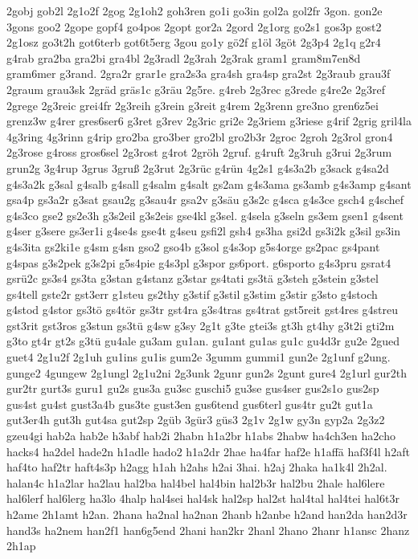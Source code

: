 {2gobj
gob2l
2g1o2f
2gog
2g1oh2
goh3ren
go1i
go3in
gol2a
gol2fr
3gon.
gon2e
3gons
goo2
2gope
gopf4
go4pos
2gopt
gor2a
2gord
2g1org
go2s1
gos3p
gost2
2g1osz
go3t2h
got6terb
got6t5erg
3gou
go1y
gö2f
g1öl
3göt
2g3p4
2g1q
g2r4
g4rab
gra2ba
gra2bi
gra4bl
2g3radl
2g3rah
2g3rak
gram1
gram8m7en8d
gram6mer
g3rand.
2gra2r
grar1e
gra2s3a
gra4sh
gra4sp
gra2st
2g3raub
grau3f
2graum
grau3sk
2gräd
gräs1c
g3räu
2g5re.
g4reb
2g3rec
g3rede
g4re2e
2g3ref
2grege
2g3reic
grei4fr
2g3reih
g3rein
g3reit
g4rem
2g3renn
gre3no
gren6z5ei
grenz3w
g4rer
gres6ser6
g3ret
g3rev
2g3ric
gri2e
2g3riem
g3riese
g4rif
2grig
gril4la
4g3ring
4g3rinn
g4rip
gro2ba
gro3ber
gro2bl
gro2b3r
2groc
2groh
2g3rol
gron4
2g3rose
g4ross
gros6sel
2g3rost
g4rot
2gröh
2gruf.
g4ruft
2g3ruh
g3rui
2g3rum
grun2g
3g4rup
3grus
3gruß
2g3rut
2g3rüc
g4rün
4g2s1
g4s3a2b
g3sack
g4sa2d
g4s3a2k
g3sal
g4salb
g4sall
g4salm
g4salt
gs2am
g4s3ama
gs3amb
g4s3amp
g4sant
gsa4p
gs3a2r
g3sat
gsau2g
g3sau4r
gsa2v
g3säu
g3s2c
g4sca
g4s3ce
gsch4
g4schef
g4s3co
gse2
gs2e3h
g3s2eil
g3s2eis
gse4kl
g3sel.
g4sela
g3seln
gs3em
gsen1
g4sent
g4ser
g3sere
gs3er1i
g4se4s
gse4t
g4seu
gsfi2l
gsh4
gs3ha
gsi2d
gs3i2k
g3sil
gs3in
g4s3ita
gs2ki1e
g4sm
g4sn
gso2
gso4b
g3sol
g4s3op
g5s4orge
gs2pac
gs4pant
g4spas
g3s2pek
g3s2pi
g5s4pie
g4s3pl
g3spor
gs6port.
g6sporto
g4s3pru
gsrat4
gsrü2c
gs3s4
gs3ta
g3stan
g4stanz
g3star
gs4tati
gs3tä
g3steh
g3stein
g3stel
gs4tell
gste2r
gst3err
g1steu
gs2thy
g3stif
g3stil
g3stim
g3stir
g3sto
g4stoch
g4stod
g4stor
gs3tö
gs4tör
gs3tr
gst4ra
g3s4tras
gs4trat
gst5reit
gst4res
g4streu
gst3rit
gst3ros
g3stun
gs3tü
g4sw
g3sy
2g1t
g3te
gtei3s
gt3h
gt4hy
g3t2i
gti2m
g3to
gt4r
gt2s
g3tü
gu4ale
gu3am
gu1an.
gu1ant
gu1as
gu1c
gu4d3r
gu2e
2gued
guet4
2g1u2f
2g1uh
gu1ins
gu1is
gum2e
3gumm
gummi1
gun2e
2g1unf
g2ung.
gunge2
4gungew
2g1ungl
2g1u2ni
2g3unk
2gunr
gun2s
2gunt
gure4
2g1url
gur2th
gur2tr
gurt3s
guru1
gu2s
gus3a
gu3sc
guschi5
gu3se
gus4ser
gus2s1o
gus2sp
gus4st
gu4st
gust3a4b
gus3te
gust3en
gus6tend
gus6terl
gus4tr
gu2t
gut1a
gut3er4h
gut3h
gut4sa
gut2sp
2güb
3gür3
güs3
2g1v
2g1w
gy3n
gyp2a
2g3z2
gzeu4gi
hab2a
hab2e
h3abf
hab2i
2habn
h1a2br
h1abs
2habw
ha4ch3en
ha2cho
hacks4
ha2del
hade2n
h1adle
hado2
h1a2dr
2hae
ha4far
haf2e
h1affä
haf3f4l
h2aft
haf4to
haf2tr
haft4s3p
h2agg
h1ah
h2ahs
h2ai
3hai.
h2aj
2haka
ha1k4l
2h2al.
halan4c
h1a2lar
ha2lau
hal2ba
hal4bel
hal4bin
hal2b3r
hal2bu
2hale
hal6lere
hal6lerf
hal6lerg
ha3lo
4halp
hal4sei
hal4sk
hal2sp
hal2st
hal4tal
hal4tei
hal6t3r
h2ame
2h1amt
h2an.
2hana
ha2nal
ha2nan
2hanb
h2anbe
h2and
han2da
han2d3r
hand3s
ha2nem
han2f1
han6g5end
2hani
han2kr
2hanl
2hano
2hanr
h1ansc
2hanz
2h1ap
}
